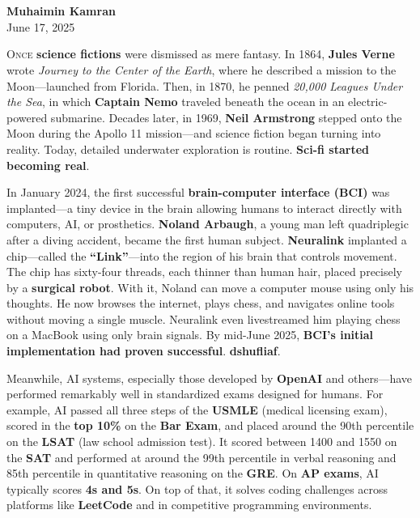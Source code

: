 \documentclass[a4paper,10pt,twocolumn]{memoir}
\newcommand{\article}[3]{
  \section*{#1}
  \addcontentsline{toc}{section}{#1}
  \begin{center}
    \color{dark}\normalsize\textbf{#2}\\
    \small\color{gray}#3
  \end{center}
  \vspace{-0.8em}  %
}
\begin{document}
\clearpage



\article{}{Muhaimin Kamran}{June 17, 2025}
\lettrine[lines=3]{O}{nce} \textbf{science fictions} were dismissed as mere fantasy. In 1864, \textbf{Jules Verne} wrote \textit{Journey to the Center of the Earth}, where he described a mission to the Moon—launched from Florida. Then, in 1870, he penned \textit{20,000 Leagues Under the Sea}, in which \textbf{Captain Nemo} traveled beneath the ocean in an electric-powered submarine. Decades later, in 1969, \textbf{Neil Armstrong} stepped onto the Moon during the Apollo 11 mission—and science fiction began turning into reality. Today, detailed underwater exploration is routine. \textbf{Sci-fi started becoming real}.

In January 2024, the first successful \textbf{brain-computer interface (BCI)} was implanted—a tiny device in the brain allowing humans to interact directly with computers, AI, or prosthetics. \textbf{Noland Arbaugh}, a young man left quadriplegic after a diving accident, became the first human subject. \textbf{Neuralink} implanted a chip—called the \textbf{“Link”}—into the region of his brain that controls movement. The chip has sixty-four threads, each thinner than human hair, placed precisely by a \textbf{surgical robot}. With it, Noland can move a computer mouse using only his thoughts. He now browses the internet, plays chess, and navigates online tools without moving a single muscle. Neuralink even livestreamed him playing chess on a MacBook using only brain signals. By mid-June 2025, \textbf{BCI’s initial implementation had proven successful}. \textbf{dshufliaf}. 

Meanwhile, AI systems, especially those developed by \textbf{OpenAI} and others—have performed remarkably well in standardized exams designed for humans. For example, AI passed all three steps of the \textbf{USMLE} (medical licensing exam), scored in the \textbf{top 10\%} on the \textbf{Bar Exam}, and placed around the 90th percentile on the \textbf{LSAT} (law school admission test). It scored between 1400 and 1550 on the \textbf{SAT} and performed at around the 99th percentile in verbal reasoning and 85th percentile in quantitative reasoning on the \textbf{GRE}. On \textbf{AP exams}, AI typically scores \textbf{4s and 5s}. On top of that, it solves coding challenges across platforms like \textbf{LeetCode} and in competitive programming environments.
\end{document}
